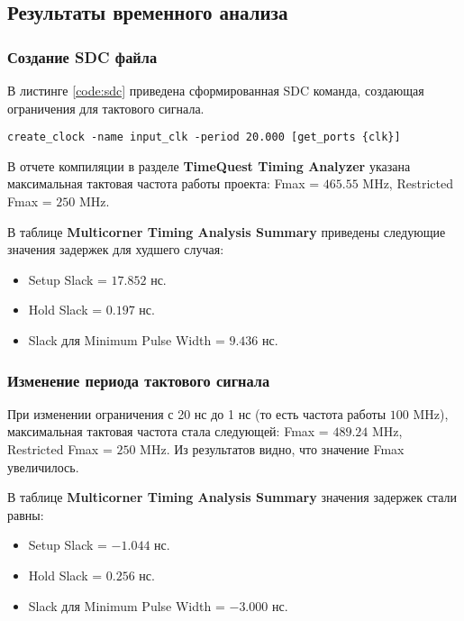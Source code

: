 
\subsection{Результаты временного анализа}

\subsubsection{Создание SDC файла}

В листинге \ref{code:sdc} приведена сформированная SDC команда, создающая ограничения для тактового сигнала.

\begin{lstlisting}[caption=Synopsys Design Constraints (SDC) файл, label=code:sdc]
create_clock -name input_clk -period 20.000 [get_ports {clk}]
\end{lstlisting}

В отчете компиляции в разделе \textbf{TimeQuest Timing Analyzer} указана максимальная тактовая частота работы проекта: Fmax = $465.55$ MHz, Restricted Fmax = $250$ MHz.

В таблице \textbf{Multicorner Timing Analysis Summary} приведены следующие значения задержек для худшего случая:
\begin{itemize}
\setlength\itemsep{0em}
\item Setup Slack = $17.852$ нс.
\item Hold Slack = $0.197$ нс.
\item Slack для Minimum Pulse Width = $9.436$ нс.
\end{itemize}

\subsubsection{Изменение периода тактового сигнала}

При изменении ограничения с 20 нс до 1 нс (то есть частота работы $10$0 MHz), максимальная тактовая частота стала следующей: Fmax = $489.24$ MHz, Restricted Fmax = $250$ MHz. Из результатов видно, что значение Fmax увеличилось.

В таблице \textbf{Multicorner Timing Analysis Summary} значения задержек стали равны:
\begin{itemize}
\setlength\itemsep{0em}
\item Setup Slack = $-1.044$ нс.
\item Hold Slack = $0.256$ нс.
\item Slack для Minimum Pulse Width = $-3.000$ нс.
\end{itemize}

